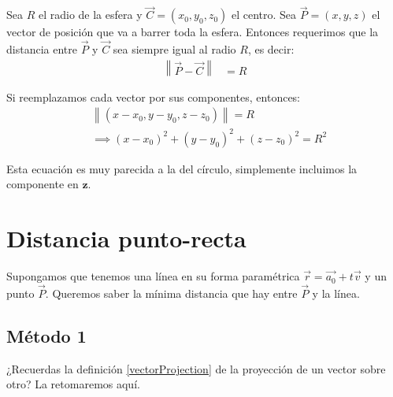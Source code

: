 \documentclass[12pt, fleqn]{report}                             %
\theoremstyle{break}                                            %
\newcommand{\Abs}[1]{\left\lVert #1 \right\lVert}               %
\newcommand{\lVec}[1]{\overrightarrow{#1}}                      %
\begin{document}
        Sea $R$ el radio de la esfera y $\vec{C}=(x_0, y_0, z_0)$ el centro. Sea $\vec{P}=(x,y,z)$ el vector de posición que va a barrer toda la esfera. Entonces requerimos que la distancia entre $\vec{P}$ y $\vec{C}$ sea siempre igual al radio $R$, es decir:
        \begin{align}
	        \Abs{\vec{P} - \vec{C}} &= R \label{sphereEquation}
        \end{align}
        
        Si reemplazamos cada vector por sus componentes, entonces:
        \begin{align}
	        &\Abs{(x-x_0, y-y_0, z-z_0)} = R \nonumber \\
	        &\implies (x-x_0)^2 + (y-y_0)^2 + (z-z_0)^2 = R^2 \label{sphereEquation2}
        \end{align}
        
        Esta ecuación es muy parecida a la del círculo, simplemente incluimos la componente en $\mathbf{z}$.
        
            
        \clearpage    
            
        \section{Distancia punto-recta}
        
        	Supongamos que tenemos una línea en su forma paramétrica $\vec{r} = \lVec{a_0} + t\vec{v}$ y un punto $\vec{P}$. Queremos saber la mínima distancia que hay entre $\vec{P}$ y la línea.
        
	        \subsection{Método 1}
	        ¿Recuerdas la definición \ref{vectorProjection} de la proyección de un vector sobre otro? La retomaremos aquí.
	        
\end{document}
